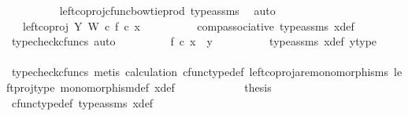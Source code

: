 \begin{isabellebody}
\ \ \ \ \ \ \ \ \isamarkupfalse%
\ left{\isacharunderscore}{\kern0pt}coproj{\isacharunderscore}{\kern0pt}cfunc{\isacharunderscore}{\kern0pt}bowtie{\isacharunderscore}{\kern0pt}prod\ type{\isacharunderscore}{\kern0pt}assms\ \isamarkupfalse%
\ auto\isanewline
\ \ \ \ \ \ \isamarkupfalse%
\ \isamarkupfalse%
\ {\isachardoublequoteopen}{\isachardot}{\kern0pt}{\isachardot}{\kern0pt}{\isachardot}{\kern0pt}\ {\isacharequal}{\kern0pt}\ left{\isacharunderscore}{\kern0pt}coproj\ Y\ W\ {\isasymcirc}\isactrlsub c\ f\ {\isasymcirc}\isactrlsub c\ x{\isachardoublequoteclose}\isanewline
\ \ \ \ \ \ \ \ \isamarkupfalse%
\ comp{\isacharunderscore}{\kern0pt}associative{}\ type{\isacharunderscore}{\kern0pt}assms{\isacharparenleft}{\kern0pt}{}{\isacharparenright}{\kern0pt}\ x{\isacharunderscore}{\kern0pt}def\ \isamarkupfalse%
\ {\isacharparenleft}{\kern0pt}typecheck{\isacharunderscore}{\kern0pt}cfuncs{\isacharcomma}{\kern0pt}\ auto{\isacharparenright}{\kern0pt}\isanewline
\ \ \ \ \ \ \isamarkupfalse%
\ \isamarkupfalse%
\ {\isachardoublequoteopen}f\ {\isasymcirc}\isactrlsub c\ x\ {\isacharequal}{\kern0pt}\ y{\isachardoublequoteclose}\isanewline
\ \ \ \ \ \ \ \ \isamarkupfalse%
\ type{\isacharunderscore}{\kern0pt}assms{\isacharparenleft}{\kern0pt}{}{\isacharparenright}{\kern0pt}\ x{\isacharunderscore}{\kern0pt}def\ y{\isacharunderscore}{\kern0pt}type{}\ \ \isanewline
\ \ \ \ \ \ \ \ \isamarkupfalse%
\ {\isacharparenleft}{\kern0pt}typecheck{\isacharunderscore}{\kern0pt}cfuncs{\isacharcomma}{\kern0pt}\ metis\ calculation\ cfunc{\isacharunderscore}{\kern0pt}type{\isacharunderscore}{\kern0pt}def\ left{\isacharunderscore}{\kern0pt}coproj{\isacharunderscore}{\kern0pt}are{\isacharunderscore}{\kern0pt}monomorphisms\ left{\isacharunderscore}{\kern0pt}proj{\isacharunderscore}{\kern0pt}type\ monomorphism{\isacharunderscore}{\kern0pt}def\ x{\isacharunderscore}{\kern0pt}def{\isacharparenright}{\kern0pt}\isanewline
\ \ \ \ \isamarkupfalse%
\isanewline
\ \ \ \ \isamarkupfalse%
\ \isamarkupfalse%
\ {\isacharquery}{\kern0pt}thesis\isanewline
\ \ \ \ \ \ \isamarkupfalse%
\ cfunc{\isacharunderscore}{\kern0pt}type{\isacharunderscore}{\kern0pt}def\ type{\isacharunderscore}{\kern0pt}assms{\isacharparenleft}{\kern0pt}{}{\isacharparenright}{\kern0pt}\ x{\isacharunderscore}{\kern0pt}def\ \isamarkupfalse%

\end{isabellebody}
